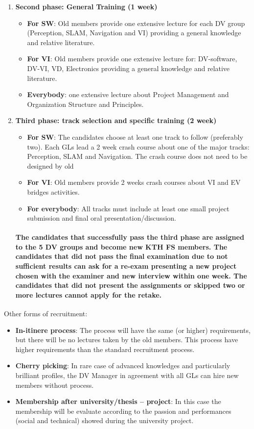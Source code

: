 \documentclass[graybox]{svmult}
\begin{document}
\begin{enumerate}
\item \textbf{Second phase: General Training (1 week)}
\begin{itemize}
\item \textbf{For SW}: Old members provide one extensive lecture for each DV group (Perception, SLAM, Navigation and VI) providing a general knowledge and relative literature.
\item \textbf{For VI}: Old members provide one extensive lecture for: DV-software, DV-VI, VD, Electronics providing a general knowledge and relative literature.
\item \textbf{Everybody}: one extensive lecture about Project Management and Organization Structure and Principles.
\end{itemize}

\item \textbf{Third phase: track selection and specific training (2 week)}
\begin{itemize}
\item \textbf{For SW}:
The candidates choose at least one track to follow (preferably two). Each GLs lead a 2 week crash course about one of the major tracks: Perception, SLAM and Navigation. The crash course does not need to be designed by old 
\item \textbf{For VI}:
Old members provide 2 weeks crash courses about VI and EV bridges activities.
\item \textbf{For everybody}: 
All tracks must include at least one small project submission and final oral presentation/discussion.
\end{itemize}

\paragraph{The candidates that successfully pass the third phase are assigned to the 5 DV groups and become new KTH FS members.
The candidates that did not pass the final examination due to not sufficient results can ask for a re-exam presenting a new project chosen with the examiner and new interview within one week.
The candidates that did not present the assignments or skipped two or more lectures cannot apply for the retake.}
\end{enumerate}

Other forms of recruitment:
\begin{itemize}
\item \textbf{In-itinere process}:
The process will have the same (or higher) requirements, but there will be no lectures taken by the old members. This process have higher requirements than the standard recruitment process.
\item \textbf{Cherry picking}:
In rare case of advanced knowledges and particularly brilliant profiles, the DV Manager in agreement with all GLs can hire new members without process.
\item \textbf{Membership after university/thesis – project}:
In this case the membership will be evaluate according to the passion and performances (social and technical) showed during the university project.
\end{itemize}
\end{document}
